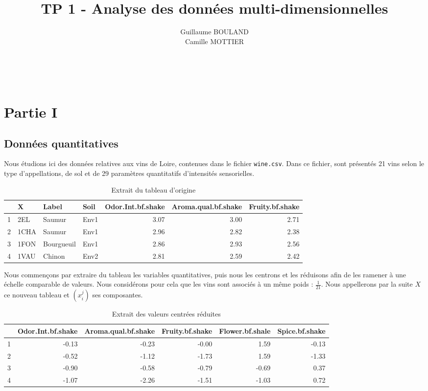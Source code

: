 \documentclass[a4paper,10pt]{article}
\title{TP 1 - Analyse des données multi-dimensionnelles}
\author{Guillaume BOULAND\\ Camille MOTTIER}
\date{}
\begin{document}
\maketitle

\

\section{Partie I}
\subsection{Données quantitatives}
Nous étudions ici des données relatives aux vins de Loire, contenues dans le fichier \texttt{wine.csv}. Dans ce fichier, sont présentés 21 vins selon le type d'appellations, de sol et de 29 paramètres quantitatifs d'intensités sensorielles. \\

\begin{table}[ht]
	\centering
	\begin{tabular}{rlllrrr}
		\hline
		& X & Label & Soil & Odor.Int.bf.shake & Aroma.qual.bf.shake & Fruity.bf.shake \\ 
		\hline
		1 & 2EL  & Saumur & Env1 & 3.07 & 3.00 & 2.71 \\ 
		2 & 1CHA & Saumur & Env1 & 2.96 & 2.82 & 2.38 \\ 
		3 & 1FON & Bourgueuil & Env1 & 2.86 & 2.93 & 2.56 \\ 
		4 & 1VAU & Chinon & Env2 & 2.81 & 2.59 & 2.42 \\ 
		\hline
	\end{tabular}
	\caption{Extrait du tableau d'origine}
\end{table}

Nous commençons par extraire du tableau les variables quantitatives, puis nous les centrons et les réduisons afin de les ramener à une échelle comparable de valeurs. Nous considérons pour cela que les vins sont associés à un même poids : $\frac 1{21}$. 
Nous appellerons par la suite $X$ ce nouveau tableau et $(x_i^j)$ ses composantes.\\

\begin{table}[ht]
	\centering
	\begin{tabular}{rrrrrr}
		\hline
		& Odor.Int.bf.shake & Aroma.qual.bf.shake & Fruity.bf.shake & Flower.bf.shale & Spice.bf.shake \\ 
		\hline
		1 & -0.13 & -0.23 & -0.00 & 1.59 & -0.13 \\ 
		2 & -0.52 & -1.12 & -1.73 & 1.59 & -1.33 \\ 
		3 & -0.90 & -0.58 & -0.79 & -0.69 & 0.37 \\ 
		4 & -1.07 & -2.26 & -1.51 & -1.03 & 0.72 \\ 
		\hline
	\end{tabular}
	\caption{Extrait des valeurs centrées réduites}
\end{table}
\end{document}
